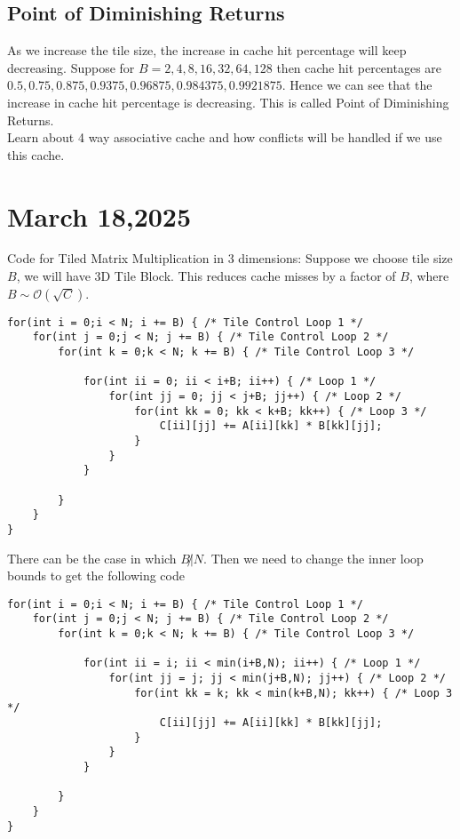 \documentclass{article}
\begin{document}
\subsection*{Point of Diminishing Returns}
As we increase the tile size, the increase in cache hit percentage will keep decreasing. Suppose for $B = 2,4,8,16,32,64,128$ then cache hit percentages are $0.5,0.75,0.875,0.9375,0.96875,0.984375,0.9921875$. Hence we can see that the increase in cache hit percentage is decreasing. This is called Point of Diminishing Returns. \\

Learn about 4 way associative cache and how conflicts will be handled if we use this cache. \\

\section*{March 18,2025}
Code for Tiled Matrix Multiplication in 3 dimensions: Suppose we choose tile size $B$, we will have 3D Tile Block. This reduces cache misses by a factor of $B$, where $B \sim \mathcal{O}(\sqrt{C})$. \\
\begin{lstlisting}
for(int i = 0;i < N; i += B) { /* Tile Control Loop 1 */
    for(int j = 0;j < N; j += B) { /* Tile Control Loop 2 */
        for(int k = 0;k < N; k += B) { /* Tile Control Loop 3 */
            
            for(int ii = 0; ii < i+B; ii++) { /* Loop 1 */
                for(int jj = 0; jj < j+B; jj++) { /* Loop 2 */
                    for(int kk = 0; kk < k+B; kk++) { /* Loop 3 */
                        C[ii][jj] += A[ii][kk] * B[kk][jj];
                    }
                }
            }

        }
    }
}
\end{lstlisting}

There can be the case in which $B \not| N$. Then we need to change the inner loop bounds to get the following code
\begin{lstlisting}
for(int i = 0;i < N; i += B) { /* Tile Control Loop 1 */
    for(int j = 0;j < N; j += B) { /* Tile Control Loop 2 */
        for(int k = 0;k < N; k += B) { /* Tile Control Loop 3 */
            
            for(int ii = i; ii < min(i+B,N); ii++) { /* Loop 1 */
                for(int jj = j; jj < min(j+B,N); jj++) { /* Loop 2 */
                    for(int kk = k; kk < min(k+B,N); kk++) { /* Loop 3 */
                        C[ii][jj] += A[ii][kk] * B[kk][jj];
                    }
                }
            }

        }
    }
}
\end{lstlisting}
\end{document}
